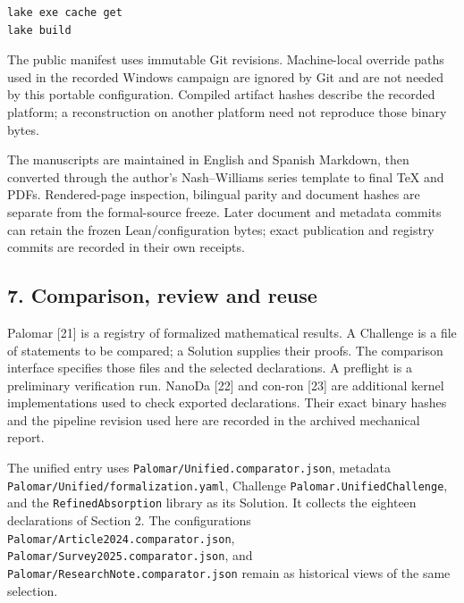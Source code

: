 \documentclass[english,11pt,a4paper]{article}
\begin{document}
\begin{verbatim}
lake exe cache get
lake build
\end{verbatim}

The public manifest uses immutable Git revisions. Machine-local override paths used in the recorded Windows campaign are ignored by Git and are not needed by this portable configuration. Compiled artifact hashes describe the recorded platform; a reconstruction on another platform need not reproduce those binary bytes.

The manuscripts are maintained in English and Spanish Markdown, then converted through the author's Nash--Williams series template to final TeX and PDFs. Rendered-page inspection, bilingual parity and document hashes are separate from the formal-source freeze. Later document and metadata commits can retain the frozen Lean/configuration bytes; exact publication and registry commits are recorded in their own receipts.

\subsection{7. Comparison, review and reuse}\label{comparison-review-and-reuse}

Palomar {[}21{]} is a registry of formalized mathematical results. A Challenge is a file of statements to be compared; a Solution supplies their proofs. The comparison interface specifies those files and the selected declarations. A preflight is a preliminary verification run. NanoDa {[}22{]} and con-ron {[}23{]} are additional kernel implementations used to check exported declarations. Their exact binary hashes and the pipeline revision used here are recorded in the archived mechanical report.

The unified entry uses \texttt{Palomar/\allowbreak{}Unified.\allowbreak{}comparator.\allowbreak{}json}, metadata \texttt{Palomar/\allowbreak{}Unified/\allowbreak{}formalization.\allowbreak{}yaml}, Challenge \texttt{Palomar.\allowbreak{}Unified\allowbreak{}Challenge}, and the \texttt{Refined\allowbreak{}Absorption} library as its Solution. It collects the eighteen declarations of Section 2. The configurations \texttt{Palomar/\allowbreak{}Article2024.\allowbreak{}comparator.\allowbreak{}json}, \texttt{Palomar/\allowbreak{}Survey2025.\allowbreak{}comparator.\allowbreak{}json}, and \texttt{Palomar/\allowbreak{}Research\allowbreak{}Note.\allowbreak{}comparator.\allowbreak{}json} remain as historical views of the same selection.
\end{document}
